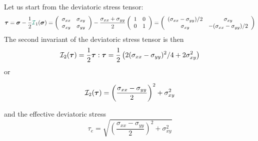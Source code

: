 Let us start from the deviatoric stress tensor:
\[
\bm\tau
=
\bm\sigma - \frac12 {\III}_1(\bm\sigma)
=
\left(\begin{array}{cc}
\sigma_{xx} & \sigma_{xy} \\ 
\sigma_{xy} & \sigma_{yy} 
\end{array}\right)
-\frac{\sigma_{xx}+\sigma_{yy}}{2} 
\left(\begin{array}{cc}
1 & 0 \\ 0 & 1
\end{array}\right)
=
\left(
\begin{array}{cc}
(\sigma_{xx}-\sigma_{yy})/2 & \sigma_{xy} \\
\sigma_{xy} & -(\sigma_{xx}-\sigma_{yy})/2
\end{array}
\right)
\]
The second invariant of the deviatoric stress tensor is then 
\[
{\cal I}_2(\bm\tau) = \frac12 \bm\tau:\bm\tau
= \frac12 \left( 2 (\sigma_{xx}-\sigma_{yy})^2/4 + 2 \sigma_{xy}^2 \right)
\]
or
\begin{mdframed}[backgroundcolor=blue!5]
\[
{\cal I}_2(\bm\tau) 
= \left(\frac{\sigma_{xx}-\sigma_{yy}}{2} \right)^2 + \sigma_{xy}^2
\]
\end{mdframed}


and the effective deviatoric stress
\[
\tau_e = 
\sqrt{\left(\frac{\sigma_{xx}-\sigma_{yy}}{2} \right)^2 + \sigma_{xy}^2}
\]


